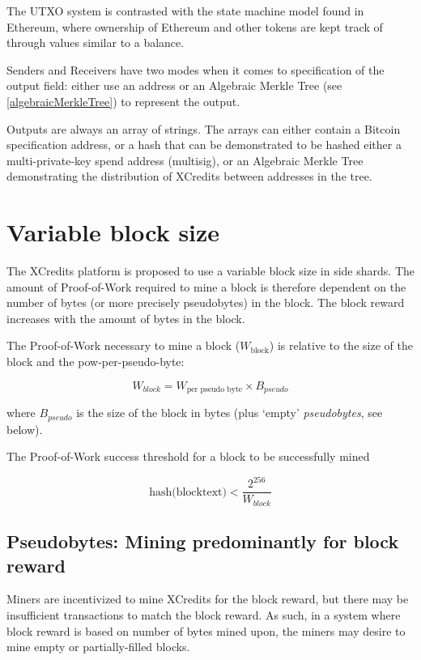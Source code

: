 \documentclass[a4paper,12pt]{article}
\begin{document}
The UTXO system is contrasted with the state machine model found in Ethereum, where ownership of Ethereum and other tokens are kept track of through values similar to a balance. 

Senders and Receivers have two modes when it comes to specification of the output field: either use an address or an Algebraic Merkle Tree (see \ref{algebraicMerkleTree}) to represent the output.

Outputs are always an array of strings. The arrays can either contain a Bitcoin specification address, or a hash that can be demonstrated to be hashed either a multi-private-key spend address (multisig), or an Algebraic Merkle Tree demonstrating the distribution of XCredits between addresses in the tree.





\section{Variable block size}\label{variable-block-size}
The XCredits platform is proposed to use a variable block size in side shards. The amount of Proof-of-Work required to mine a block is therefore dependent on the number of bytes (or more precisely \gls{pseudobytes}) in the block. The block reward increases with the amount of bytes in the block. 

The Proof-of-Work necessary to mine a block ($W_{\text{block}}$) is relative to the size of the block and the \gls{pow-per-pseudo-byte}:

\[W_{block} = W_{\text{per pseudo byte}} \times B_{pseudo}\]

where $B_{pseudo}$ is the size of the block in bytes (plus `empty' \textit{pseudobytes}, see below). 

The Proof-of-Work success threshold for a block to be successfully mined 

\[\text{hash(blocktext)} < \frac{2^{256}}{W_{block}} \]


\subsection{Pseudobytes: Mining predominantly for block reward}
Miners are incentivized to mine XCredits for the block reward, but there may be insufficient transactions to match the block reward. As such, in a system where block reward is based on number of bytes mined upon, the miners may desire to mine empty or partially-filled blocks.
\end{document}
